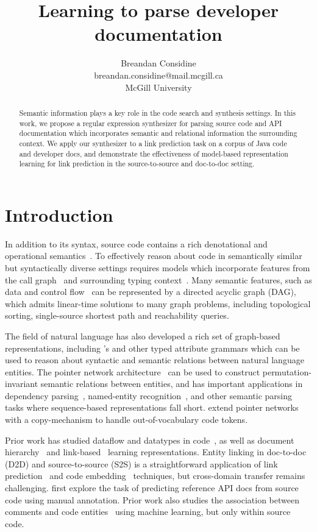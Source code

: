 \documentclass{article}
\title{Learning to parse developer documentation}
\author{Breandan Considine\\
breandan.considine@mail.mcgill.ca\\
McGill University}
\begin{document}
\maketitle

\begin{abstract}
Semantic information plays a key role in the code search and synthesis settings. In this work, we propose a regular expression synthesizer for parsing source code and API documentation which incorporates semantic and relational information the surrounding context. We apply our synthesizer to a link prediction task on a corpus of Java code and developer docs, and demonstrate the effectiveness of model-based representation learning for link prediction in the source-to-source and doc-to-doc setting.
\end{abstract}

\section{Introduction}

In addition to its syntax, source code contains a rich denotational and operational semantics~\citep{henkel2018code}. To effectively reason about code in semantically similar but syntactically diverse settings requires models which incorporate features from the call graph~\citep{gu2016deep, liu2019neural} and surrounding typing context~\citep{allamanis2017learning}. Many semantic features, such as data and control flow~\citep{si2018learning} can be represented by a directed acyclic graph (DAG), which admits linear-time solutions to many graph problems, including topological sorting, single-source shortest path and reachability queries.

The field of natural language has also developed a rich set of graph-based representations, including \citet{reddy2016transforming}'s and other typed attribute grammars which can be used to reason about syntactic and semantic relations between natural language entities. The pointer network architecture~\citep{vinyals2015pointer, vinyals2015order} can be used to construct permutation-invariant semantic relations between entities, and has important applications in dependency parsing~\citep{ma2018stack}, named-entity recognition~\citep{lample2016neural}, and other semantic parsing tasks where sequence-based representations fall short. \citet{li2017code} extend pointer networks with a copy-mechanism to handle out-of-vocabulary code tokens.

Prior work has studied dataflow and datatypes in code~\citep{si2018learning, gu2018deep, liu2019neural}, as well as document hierarchy~\citep{yang2016hierarchical} and link-based~\citep{zhang2018link} learning representations. Entity linking in doc-to-doc (D2D) and source-to-source (S2S) is a straightforward application of link prediction~\citep{zhang2018link} and code embedding~\citep{gu2018deep} techniques, but cross-domain transfer remains challenging. \citet{robillard2015recommending, robillard2017demand} first explore the task of predicting reference API docs from source code using manual annotation. Prior work also studies the association between comments and code entities~\citep{iyer2018mapping, panthaplackel2020associating} using machine learning, but only within source code.
\end{document}
